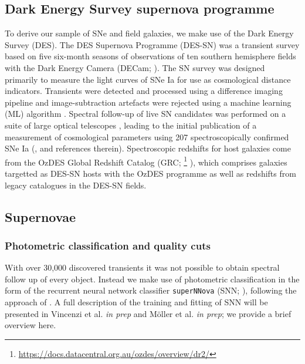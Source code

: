 \documentclass[fleqn,usenatbib]{mnras}
\begin{document}
\subsection{Dark Energy Survey supernova programme \label{subsec:des}}
To derive our sample of SNe and field galaxies, we make use of the Dark Energy Survey (DES). The DES Supernova Programme (DES-SN) was a transient survey based on five six-month seasons of observations of ten southern hemisphere fields with the Dark Energy Camera (DECam; \citealt{Flaugher2015}). The SN survey was designed primarily to measure the light curves of SNe Ia for use as cosmological distance indicators. Transients were detected and processed using a difference imaging pipeline \citep{Kessler2015} and image-subtraction artefacts were rejected using a machine learning (ML) algorithm \citep{Goldstein2015}. Spectral follow-up of live SN candidates was performed on a suite of large optical telescopes \citep{Smith2020a}, leading to the initial publication of a measurement of cosmological parameters using 207 spectroscopically confirmed SNe Ia (\citealt{DESCollaboration2018a}, and references therein). Spectroscopic redshifts for host galaxies come from the OzDES Global Redshift Catalog (GRC; \footnote{\url{https://docs.datacentral.org.au/ozdes/overview/dr2/}} \citealt{Yuan2015,Childress2017,Lidman2020}), which comprises galaxies targetted as DES-SN hosts with the OzDES programme as well as redshifts from legacy catalogues in the DES-SN fields.
\subsection{Supernovae \label{subsec:host_sample}}
\subsubsection{Photometric classification and quality cuts \label{subsubsec:sn_classify}}
With over 30,000 discovered transients it was not possible to obtain spectral follow up of every object. Instead we make use of photometric classification in the form of the recurrent neural network classifier \texttt{superNNova} (SNN; \citealt{Moller2019}), following the approach of \citet{Scolnic2020}. A full description of the training and fitting of SNN will be presented in Vincenzi et al. \textit{in prep} and M\"{o}ller et al. \textit{in prep}; we provide a brief overview here.
\end{document}
